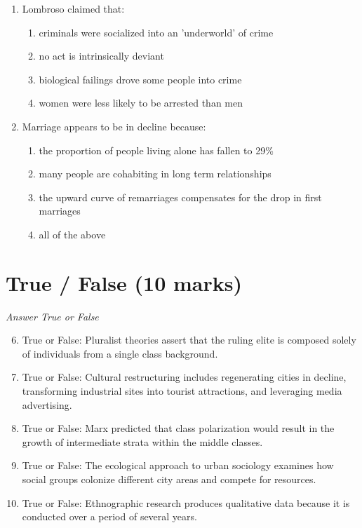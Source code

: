\documentclass[12pt]{article}
\begin{document}
\begin{enumerate}[label=\arabic*.]
\item Lombroso claimed that:
\begin{enumerate}[label=(\alph*)]
    \item criminals were socialized into an 'underworld' of crime
    \item no act is intrinsically deviant
    \item biological failings drove some people into crime
    \item women were less likely to be arrested than men
\end{enumerate}
\item Marriage appears to be in decline because:
\begin{enumerate}[label=(\alph*)]
    \item the proportion of people living alone has fallen to 29\%
    \item many people are cohabiting in long term relationships
    \item the upward curve of remarriages compensates for the drop in first marriages
    \item all of the above
\end{enumerate}
\end{enumerate}

\section*{True / False (10 marks)}
\textit{Answer True or False}
\begin{enumerate}[label=\arabic*.]
\setcounter{enumi}{5}
\item True or False: Pluralist theories assert that the ruling elite is composed solely of individuals from a single class background.
\item True or False: Cultural restructuring includes regenerating cities in decline, transforming industrial sites into tourist attractions, and leveraging media advertising.
\item True or False: Marx predicted that class polarization would result in the growth of intermediate strata within the middle classes.
\item True or False: The ecological approach to urban sociology examines how social groups colonize different city areas and compete for resources.
\item True or False: Ethnographic research produces qualitative data because it is conducted over a period of several years.
\end{enumerate}
\end{document}
